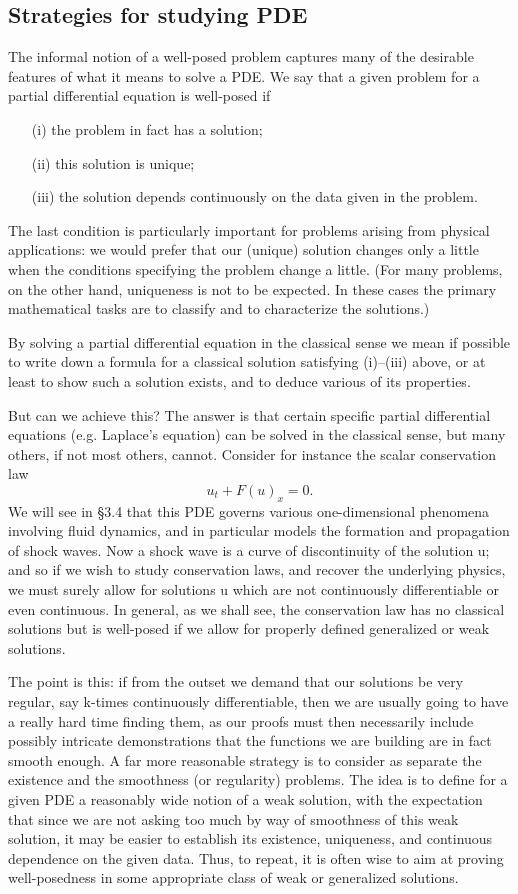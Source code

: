 \subsection{Strategies for studying PDE}
The informal notion of a well-posed problem captures many of the desirable features of what it means to solve a PDE. We say that a given problem for a partial differential equation is well-posed if
\begin{itemize}
    \item[(i)] the problem in fact has a solution;
    \item[(ii)] this solution is unique;
    \item[(iii)] the solution depends continuously on the data given in the problem.
\end{itemize}
The last condition is particularly important for problems arising from physical applications: we would prefer that our (unique) solution changes only a little when the conditions specifying the problem change a little. (For many problems, on the other hand, uniqueness is not to be expected. In these cases the primary mathematical tasks are to classify and to characterize the solutions.)

By solving a partial differential equation in the classical sense we mean
if possible to write down a formula for a classical solution satisfying (i)–(iii)
above, or at least to show such a solution exists, and to deduce various of
its properties.

But can we achieve this? The answer is that certain specific partial
differential equations (e.g. Laplace’s equation) can be solved in the classical
sense, but many others, if not most others, cannot. Consider for instance the scalar conservation law
\[
    u_t + F(u)_x = 0.
\]  
We will see in §3.4 that this PDE governs various one-dimensional phenomena
involving fluid dynamics, and in particular models the formation and
propagation of shock waves. Now a shock wave is a curve of discontinuity
of the solution u; and so if we wish to study conservation laws, and recover
the underlying physics, we must surely allow for solutions u which are not
continuously differentiable or even continuous. In general, as we shall see,
the conservation law has no classical solutions but is well-posed if we allow
for properly defined generalized or weak solutions.

The point is this: if from the outset we demand that our solutions be very
regular, say k-times continuously differentiable, then we are usually going
to have a really hard time finding them, as our proofs must then necessarily
include possibly intricate demonstrations that the functions we are building
are in fact smooth enough. A far more reasonable strategy is to consider as
separate the existence and the smoothness (or regularity) problems. The idea
is to define for a given PDE a reasonably wide notion of a weak solution, with
the expectation that since we are not asking too much by way of smoothness
of this weak solution, it may be easier to establish its existence, uniqueness,
and continuous dependence on the given data. Thus, to repeat, it is often
wise to aim at proving well-posedness in some appropriate class of weak or
generalized solutions.

